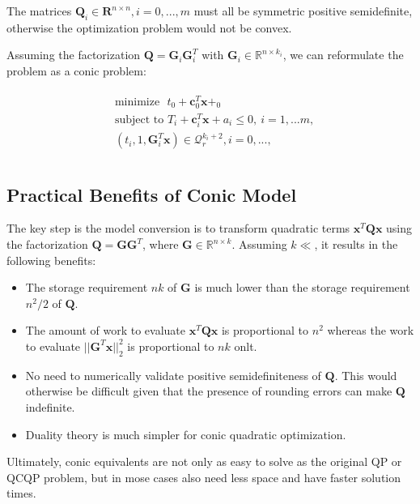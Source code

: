 \documentclass{article}
\begin{document}
The matrices $\mathbf{Q}_i \in\mathbf{R}^{n\times n}, i = 0,...,m$ must all be symmetric positive
semidefinite, otherwise the optimization problem would not be convex.

Assuming the factorization $\mathbf{Q}=\mathbf{G}_i\mathbf{G}^T_i$ with
$\mathbf{G}_i\in\mathbb{R}^{n\times k_i}$, we can reformulate the problem
as a conic problem:

\begin{align}
  \begin{split}
    &\text{minimize ~} t_0+\mathbf{c}_0^T\mathbf{x}+_0 \\
    &\text{subject to } T_i + \mathbf{c}_i^T\mathbf{x} + a_i \leq 0,~ i=1,...m, \\
    &(t_i,1,\mathbf{G}^T_i\mathbf{x}) \in \mathcal{Q}_r^{k_i+2}, i=0,..., \\
  \end{split}
\end{align}

\subsection{Practical Benefits of Conic Model}
The key step is the model conversion is to transform quadratic terms $\mathbf{x}^T\mathbf{Q}\mathbf{x}$
using the factorization $\mathbf{Q}=\mathbf{G}\mathbf{G}^T$, where $\mathbf{G}\in\mathbb{R}^{n\times k}$.
Assuming $k\ll$, it results in the following benefits:
\begin{itemize}
\item{ The storage requirement $nk$ of $\mathbf{G}$ is much lower than the storage requirement
  $n^2/2$ of $\mathbf{Q}$.}
\item{The amount of work to evaluate $\mathbf{x}^T\mathbf{Q}\mathbf{x}$ is proportional to $n^2$
  whereas the work to evaluate $||\mathbf{G}^T\mathbf{x}||^2_2$ is proportional to $nk$ onlt.}
\item{ No need to numerically validate positive semidefiniteness of $\mathbf{Q}$. This would
  otherwise be difficult given that the presence of rounding errors can make $\mathbf{Q}$ indefinite.}
\item{Duality theory is much simpler for conic quadratic optimization.}
\end{itemize}

Ultimately, conic equivalents are not only as easy to solve as the original QP or QCQP problem, but
in mose cases also need less space and have faster solution times.
\end{document}
